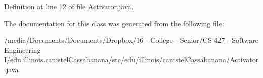 Definition at line 12 of file Activator.java.



The documentation for this class was generated from the following file:\begin{DoxyCompactItemize}
\item 
/media/Documents/Documents/Dropbox/16 -\/ College -\/ Senior/CS 427 -\/ Software Engineering I/edu.illinois.canistelCassabanana/src/edu/illinois/canistelCassabanana/\hyperlink{Activator_8java}{Activator.java}\end{DoxyCompactItemize}
